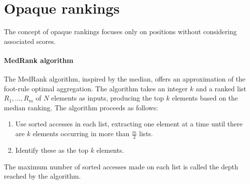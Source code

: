 \section{Opaque rankings}

The concept of opaque rankings focuses only on positions without considering associated scores.

\paragraph*{MedRank algorithm}
The MedRank algorithm, inspired by the median, offers an approximation of the foot-rule optimal aggregation.
The algorithm takes an integer $k$ and a ranked list $R_1,\dots,R_m$ of $N$ elements as inputs, producing the top $k$ elements based on the median ranking.
The algorithm proceeds as follows:
\begin{enumerate}
    \item Use sorted accesses in each list, extracting one element at a time until there are $k$ elements occurring in more than $\frac{m}{2}$ lists.
    \item Identify these as the top $k$ elements.
\end{enumerate}
\begin{definition}
    The maximum number of sorted accesses made on each list is called the depth reached by the algorithm. 
\end{definition}
\bigskip
